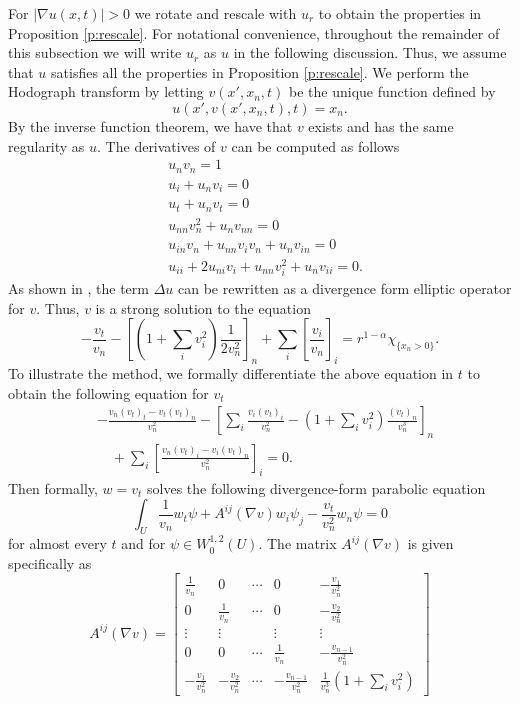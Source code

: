 \documentclass{amsart}
\numberwithin{equation}{section}
\begin{document}
  
   For $|\nabla u(x,t)|>0$ we rotate and rescale with $u_r$ to obtain the properties in Proposition \ref{p:rescale}. For notational convenience, throughout the remainder of this subsection we will write $u_r$ as $u$ in the following discussion. Thus, we assume that $u$ satisfies all the properties in Proposition \ref{p:rescale}. We perform the Hodograph transform by letting $v(x',x_n,t)$ be the unique function defined by 
 \begin{equation} \label{e:hodograph}
     u(x',v(x',x_n,t),t)=x_n. 
 \end{equation}
 By the inverse function theorem, we have that $v$ exists and has the same regularity as $u$. The derivatives of $v$ can be computed as follows 
 \[
 \begin{aligned}
     &u_n v_n = 1 \\
     &u_i + u_n v_i =0 \\
     &u_t + u_n v_t =0 \\
     &u_{nn} v_n^2 + u_n v_{nn} = 0\\
     &u_{in} v_n + u_{nn} v_i v_n + u_n v_{in}=0 \\
     &u_{ii}+2u_{ni}v_i + u_{nn} v_i^2 + u_n v_{ii}=0. 
 \end{aligned}
 \]
 As shown in \cite{aks25}, the term $\Delta u$ can be rewritten as a divergence form elliptic operator for $v$. Thus, $v$ is a strong solution to the equation 
 \[
  -\frac{v_t}{v_n}- \left[\left(1+ \sum_i v_i^2 \right)\frac{1}{2v_n^2} \right]_n
  +\sum_i \left[\frac{v_i}{v_n} \right]_i= r^{1-\alpha} \chi_{\{x_n >0\}}. 
 \]
To illustrate the method, we formally differentiate the above equation in $t$ to obtain the following equation for $v_t$ 
\[
\begin{aligned}
&-\frac{v_n (v_{t})_t-v_t (v_t)_n}{v_n^2}
-\left[\sum_i \frac{v_i(v_t)_i}{v_n^2}- \left(1+ \sum_i v_i^2 \right)\frac{(v_{t})_n}{v_n^3} \right]_n \\
&\quad + \sum_i \left[\frac{v_n (v_t)_i - v_i (v_t)_n}{v_n^2} \right]_i =0. 
\end{aligned}
\]
Then formally, $w=v_t$ solves the following divergence-form parabolic equation 
\begin{equation} \label{e:formal}
\int_U \frac{1}{v_n} w_t \psi + A^{ij}(\nabla v) w_i \psi_j -\frac{v_t}{v_n^2}w_n \psi =0
\end{equation}
for almost every $t$ and for $\psi \in W_0^{1,2}(U)$. The matrix $A^{ij}(\nabla v)$ is given specifically as 
\[
	A^{ij}(\nabla v) =  \begin{bmatrix}
		\frac{1}{v_n} & 0 & \cdots & 0 & -\frac{v_1}{v_n^2} \\
		0 & \frac{1}{v_n} & \cdots & 0 & -\frac{v_2}{v_n^2} \\
		\vdots & \vdots & &\vdots & \vdots \\
		0 & 0 & \cdots & \frac{1}{v_n} &-\frac{v_{n-1}}{v_n^2} \\
		-\frac{v_1}{v_n^2} & -\frac{v_2}{v_n^2} & \cdots & -\frac{v_{n-1}}{v_n^2} & \frac{1}{v_n^3}(1 + \sum_i v_i^2)
	\end{bmatrix}
\]
\end{document}
